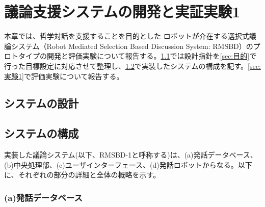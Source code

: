 \documentclass[11pt, a4paper]{jreport} %
\begin{document}
\chapter{議論支援システムの開発と実証実験1}

本章では、哲学対話を支援することを目的とした
ロボットが介在する選択式議論システム（Robot Mediated Selection Based Discussion System: RMSBD）のプロトタイプの開発と評価実験について報告する。\ref{sec:要件1}では設計指針を\ref{sec:目的}で行った目標設定に対応させて整理し、\ref{sec:構成1}で実装したシステムの構成を記す。\ref{sec:実験1}で評価実験について報告する。




\section{システムの設計}
\label{sec:要件1}



\section{システムの構成}
\label{sec:構成1}
実装した議論システム(以下、RMSBD-1と呼称する)は、(a)発話データベース、(b)中央処理部、(c)ユーザインターフェース、(d)発話ロボットからなる。以下に、それぞれの部分の詳細と全体の概略を示す。

\subsection*{(a)発話データベース}
\end{document}
